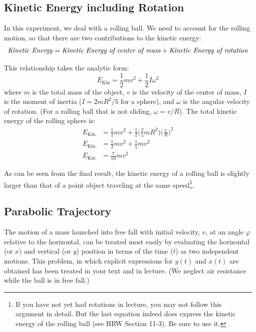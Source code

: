\subsection{Kinetic Energy including Rotation}

In this experiment, we deal with a rolling ball. We need to account for the rolling motion, so that there are two contributions to the kinetic energy:
\begin{equation}
  \textrm{\emph{Kinetic Energy}} = \textrm{\emph{Kinetic Energy of center of mass}}+\textrm{\emph{Kinetic Energy of rotation}}
\end{equation}

This relationship takes the analytic form:
\begin{equation}
  E_{\textrm{Kin}}=\frac{1}{2}mv^2+\frac{1}{2}I\omega^2
\end{equation}
where $m$ is the total mass of the object, $v$ is the velocity of the center of mass, $I$ is the moment of inertia ($I = 2m R^2/5$ for a sphere), and $\omega$ is the angular velocity of rotation. (For a rolling ball that is not sliding, $\omega=v/R$). The total kinetic energy of the rolling sphere is:
\begin{align}
  E_{\textrm{Kin}}&=\frac{1}{2}mv^2+\frac{1}{2}\bigg(\frac{2}{5}mR^2\bigg)\bigg(\frac{v}{R}\bigg)^2\\
  E_{\textrm{Kin}}&=\frac{1}{2}mv^2+\frac{1}{5}mv^2\\
  E_{\textrm{Kin}}&=\frac{7}{10}mv^2
\end{align}

As can be seen from the final result, the kinetic energy of a rolling ball is slightly larger than that of a point object traveling at the same speed\footnote{If you have not yet had rotations in lecture, you may not follow this argument in detail. But the last equation indeed does express the kinetic energy of the rolling ball (see HRW Section 11-3). Be sure to use it.}.

\subsection{Parabolic Trajectory}
The motion of a mass launched into free fall with initial velocity, $v$, at an angle $\varphi$ relative to the horizontal, can be treated most easily by evaluating the horizontal (or $x$) and vertical (or $y$) position in terms of the time ($t$) as two independent motions. This problem, in which explicit expressions for $y(t)$ and $x(t)$ are obtained has been treated in your text and in lecture. (We neglect air resistance while the ball is in free fall.)


